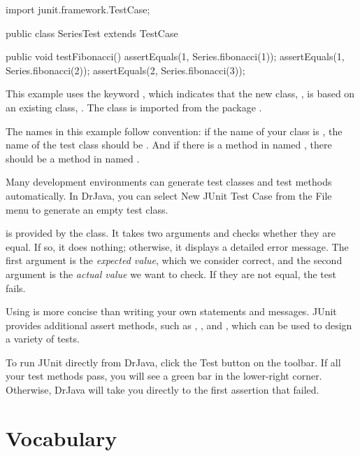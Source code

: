\begin{code}
import junit.framework.TestCase;

public class SeriesTest extends TestCase {

    public void testFibonacci() {
        assertEquals(1, Series.fibonacci(1));
        assertEquals(1, Series.fibonacci(2));
        assertEquals(2, Series.fibonacci(3));
    }
}
\end{code}

This example uses the keyword , which indicates that the new class, , is based on an existing class, .
The  class is imported from the package .

The names in this example follow convention: if the name of your class is , the name of the test class should be .
And if there is a method in  named , there should be a method in  named .

Many development environments can generate test classes and test methods automatically.
In DrJava, you can select {\sf New JUnit Test Case} from the {\sf File} menu to generate an empty test class.

 is provided by the  class.
It takes two arguments and checks whether they are equal.
If so, it does nothing; otherwise, it displays a detailed error message.
The first argument is the {\em expected value}, which we consider correct, and the second argument is the {\em actual value} we want to check.
If they are not equal, the test fails.


Using  is more concise than writing your own  statements and  messages.
JUnit provides additional assert methods, such as , , and , which can be used to design a variety of tests.

To run JUnit directly from DrJava, click the {\sf Test} button on the toolbar.
If all your test methods pass, you will see a green bar in the lower-right corner.
Otherwise, DrJava will take you directly to the first assertion that failed.


\section{Vocabulary}

